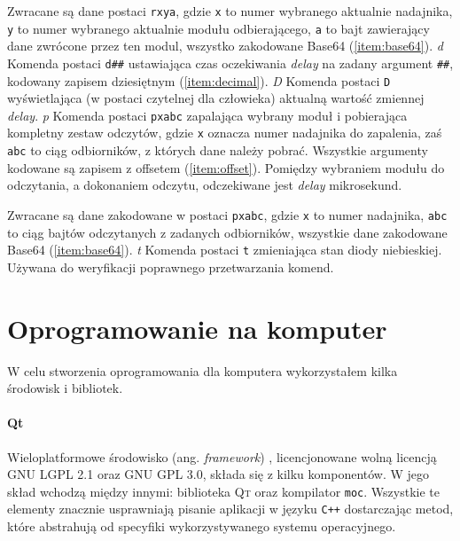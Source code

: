Zwracane są dane postaci \texttt{rxya}, gdzie \texttt{x} to numer wybranego aktualnie nadajnika, \texttt{y} to numer wybranego aktualnie modułu odbierającego, \texttt{a} to bajt zawierający dane zwrócone przez ten modul, wszystko zakodowane Base64 (\ref{item:base64}).
\newline
\newline
\textsl{d}
Komenda postaci \texttt{d\#\#} ustawiająca czas oczekiwania \textsl{delay} na zadany argument \texttt{\#\#}, kodowany zapisem dziesiętnym (\ref{item:decimal}).
\newline
\newline
\textsl{D}
Komenda postaci \texttt{D} wyświetlająca (w postaci czytelnej dla człowieka) aktualną wartość zmiennej \textsl{delay}.
\newline
\newline
\textsl{p}
Komenda postaci \texttt{pxabc} zapalająca wybrany moduł i pobierająca kompletny zestaw odczytów, gdzie \texttt{x} oznacza numer nadajnika do zapalenia, zaś \texttt{abc} to ciąg odbiorników, z których dane należy pobrać. Wszystkie argumenty kodowane są zapisem z offsetem (\ref{item:offset}). Pomiędzy wybraniem modułu do odczytania, a dokonaniem odczytu, odczekiwane jest \textsl{delay} mikrosekund.

Zwracane są dane zakodowane w postaci \texttt{pxabc}, gdzie \texttt{x} to numer nadajnika, \texttt{abc} to ciąg bajtów odczytanych z zadanych odbiorników, wszystkie dane zakodowane Base64 (\ref{item:base64}).
\newline
\newline
\textsl{t}
Komenda postaci \texttt{t} zmieniająca stan diody niebieskiej. Używana do weryfikacji poprawnego przetwarzania komend.

\section{Oprogramowanie na komputer}\label{sec:soft_desktop}
W celu stworzenia oprogramowania dla komputera wykorzystałem kilka środowisk i bibliotek.

\paragraph{Qt}
Wieloplatformowe środowisko (ang. \textsl{framework}) , licencjonowane wolną licencją \textsc{GNU LGPL 2.1} oraz \textsc{GNU GPL 3.0}, składa się z kilku komponentów.
W jego skład wchodzą między innymi: biblioteka \textsc{Qt} oraz kompilator \verb|moc|.
Wszystkie te elementy znacznie usprawniają pisanie aplikacji w języku \verb|C++| dostarczając metod, które abstrahują od specyfiki wykorzystywanego systemu operacyjnego.

